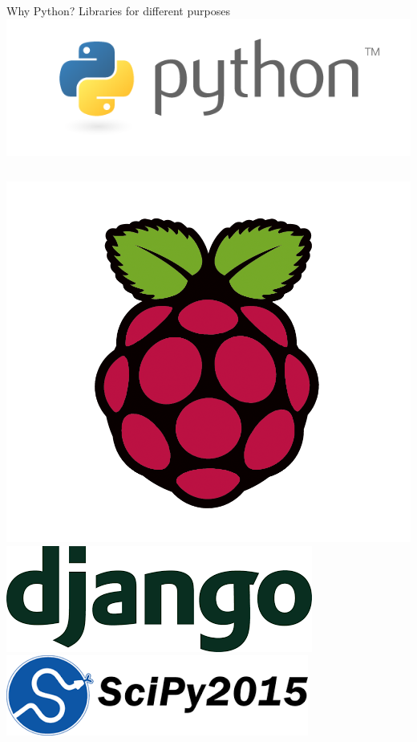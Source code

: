 \documentclass[9pt]{beamer}
\begin{document}
\begin{frame}{Why Python? Libraries for different purposes}
  \centering \includegraphics[width=0.8\linewidth]{./Figures/software_logos/pythonLogo.png}
  \begin{columns}[onlytextwidth]
      \includegraphics[width=0.8\linewidth]{./Figures/software_logos/raspberryLogo.png}
      \includegraphics[width=0.8\linewidth]{./Figures/software_logos/djangoLogo.png}
      \includegraphics[width=0.8\linewidth]{./Figures/software_logos/scipyLogo.png}
  \end{columns}
\end{frame}
\end{document}
